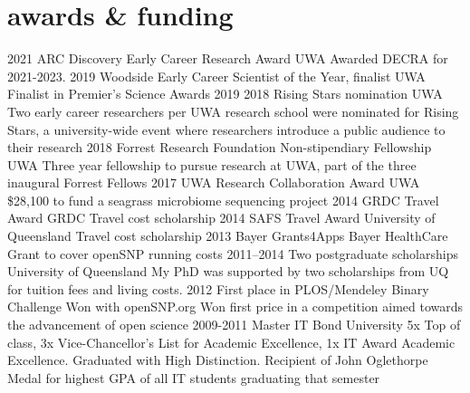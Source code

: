 \documentclass[]{friggeri-cv} %
\begin{document}
\newpage

\section{awards \& funding}

\begin{entrylist}
\entry
{2021}
{ARC Discovery Early Career Research Award}
{UWA}
{Awarded DECRA for 2021-2023.}
\entry
{2019}
{Woodside Early Career Scientist of the Year, finalist}
{UWA}
{Finalist in Premier's Science Awards 2019}
\entry
{2018}
{Rising Stars nomination}
{UWA}
{Two early career researchers per UWA research school were nominated for Rising Stars, a university-wide event where researchers introduce a public audience to their research}
\entry
{2018}
{Forrest Research Foundation Non-stipendiary Fellowship}
{UWA}
{Three year fellowship to pursue research at UWA, part of the three inaugural Forrest Fellows}
\entry
{2017}
{UWA Research Collaboration Award}
{UWA}
{\$28,100 to fund a seagrass microbiome sequencing project}
\entry
{2014}
{GRDC Travel Award}
{GRDC}
{Travel cost scholarship}
\entry
{2014}
{SAFS Travel Award}
{University of Queensland}
{Travel cost scholarship}
\entry
{2013}
{Bayer Grants4Apps}
{Bayer HealthCare}
{Grant to cover openSNP running costs}
\entry
{2011--2014}
{Two postgraduate scholarships}
{University of Queensland}
{My PhD was supported by two scholarships from UQ for tuition fees and living costs.}
\entry
{2012}
{First place in PLOS/Mendeley Binary Challenge}
{Won with openSNP.org}
{Won first price in a competition aimed towards the advancement of open science}
\entry
{2009-2011}
{Master IT}
{Bond University}
{5x Top of class,  3x Vice-Chancellor's List for Academic Excellence, 1x IT Award Academic Excellence. Graduated with High Distinction. Recipient of John Oglethorpe Medal for highest GPA of all IT students graduating that semester}
\end{entrylist}
\end{document}
